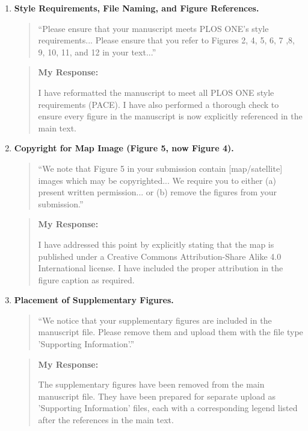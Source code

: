 \documentclass[11pt]{article}
\newenvironment{comment}{%
  \begin{quote}\em\noindent\ignorespaces%
}{%
  \end{quote}%
}
\newenvironment{response}{%
  \begin{quote}\noindent\textbf{My Response:}\par\medskip\noindent\ignorespaces%
}{%
  \end{quote}%
}
\begin{document}
\begin{enumerate}[label=\textbf{Editor's Point \arabic*:}, wide, labelwidth=!, labelindent=0pt, leftmargin=*]

    \item \textbf{Style Requirements, File Naming, and Figure References.}
        \begin{comment}
        “Please ensure that your manuscript meets PLOS ONE's style requirements... Please ensure that you refer to Figures 2, 4, 5, 6, 7 ,8, 9, 10, 11, and 12 in your text...”
        \end{comment}
        \begin{response}
        I have reformatted the manuscript to meet all PLOS ONE style requirements (PACE). I have also performed a thorough check to ensure every figure in the manuscript is now explicitly referenced in the main text.
        \end{response}

    \item \textbf{Copyright for Map Image (Figure 5, now Figure 4).}
        \begin{comment}
        “We note that Figure 5 in your submission contain [map/satellite] images which may be copyrighted... We require you to either (a) present written permission... or (b) remove the figures from your submission.”
        \end{comment}
        \begin{response}
        I have addressed this point by explicitly stating that the map is published under a Creative Commons Attribution-Share Alike 4.0 International license. I have included the proper attribution in the figure caption as required.
        \end{response}

    \item \textbf{Placement of Supplementary Figures.}
        \begin{comment}
        “We notice that your supplementary figures are included in the manuscript file. Please remove them and upload them with the file type 'Supporting Information'.”
        \end{comment}
        \begin{response}
        The supplementary figures have been removed from the main manuscript file. They have been prepared for separate upload as 'Supporting Information' files, each with a corresponding legend listed after the references in the main text.
        \end{response}

\end{enumerate}
\end{document}
